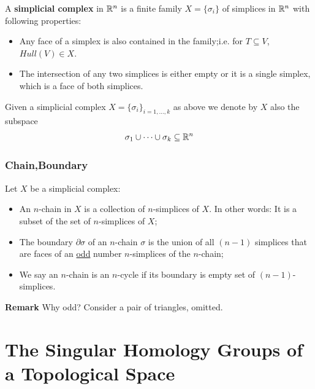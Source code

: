 \documentclass[Total.tex]{subfiles}
\begin{document}
				\begin{Def}
					A \textbf{simplicial complex} in $\mathbb{R}^n$ is a finite family $X=\{\sigma_i\}$ of simplices in $\mathbb{R}^n$ with following properties:
					\begin{itemize}
						\item Any face of a simplex is also contained in the family;i.e. for $T\subseteq V$, $Hull(V)\in X$.
						\item The intersection of any two simplices is either empty or it is a single simplex, which is a face of both simplices.
					\end{itemize}
					Given a simplicial complex $X=\{\sigma_i\}_{i=1,\dots,k}$ as above we denote by $X$ also the subspace
					\begin{gather*}
						\sigma_1\cup \dots\cup \sigma_k\subseteq \mathbb{R}^n
					\end{gather*}
				\end{Def}
				\subsubsection{Chain,Boundary}
				\begin{Def}
					Let $X$ be a simplicial complex:
					\begin{itemize}
						\item An $n$-chain in $X$ is a collection of $n$-simplices of $X$. In other words: It is a subset of the set of $n$-simplices of $X$;
						\item The boundary $\partial \sigma$ of an $n$-chain $\sigma$ is the union of all $(n-1)$ simplices that are faces of an \underline{odd} number $n$-simplices of the $n$-chain;
						\item We say an $n$-chain is an $n$-cycle if its boundary is empty set of $(n-1)$-simplices.
					\end{itemize}
				\end{Def}
				\textbf{Remark} Why odd? Consider a pair of triangles, omitted.
		\section{The Singular Homology Groups of a Topological Space}
\end{document}
